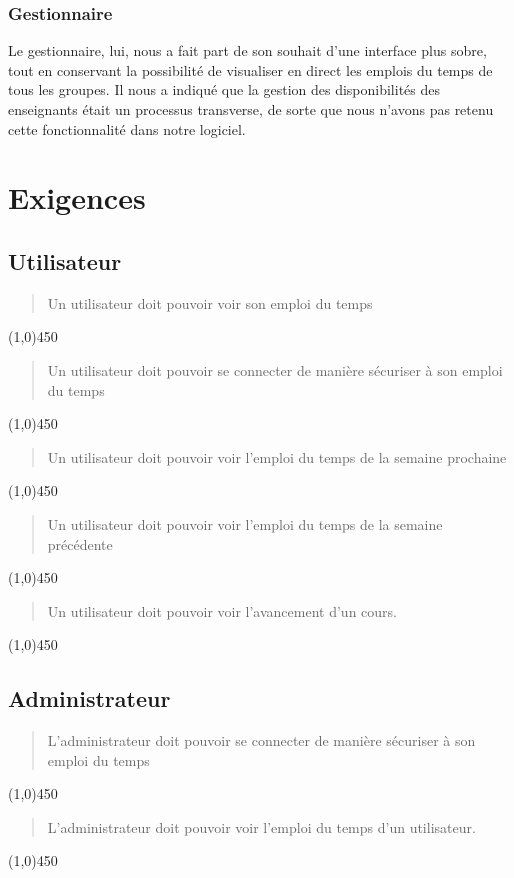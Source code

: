 \documentclass[a4paper,french,final]{memoir}
\begin{document}
\subsection{Gestionnaire}
Le gestionnaire, lui, nous a fait part de son souhait d'une interface plus sobre, tout en conservant la possibilité de visualiser en direct les emplois du temps de tous les groupes. Il nous a indiqué que la gestion des disponibilités des enseignants était un processus transverse, de sorte que nous n'avons pas retenu cette fonctionnalité dans notre logiciel. 
\mainmatter
\chapter{Exigences}\label{chap:exigence}
\section{Utilisateur
}
\begin{quote}
    Un utilisateur doit pouvoir voir son emploi du temps
\end{quote}
\line(1,0){450}

\begin{quote}
    Un utilisateur doit pouvoir se connecter de manière sécuriser à son emploi du temps
\end{quote}
\line(1,0){450}

\begin{quote}
    Un utilisateur doit pouvoir voir l'emploi du temps de la semaine prochaine
\end{quote}
\line(1,0){450}

\begin{quote}
    Un utilisateur doit pouvoir voir l'emploi du temps de la semaine précédente
\end{quote}
\line(1,0){450}

\begin{quote}
    Un utilisateur doit pouvoir voir l'avancement d'un cours.
\end{quote}
\line(1,0){450}


\section{Administrateur}
\begin{quote}
    L'administrateur doit pouvoir se connecter de manière sécuriser à son emploi du temps
\end{quote}
\line(1,0){450}

\begin{quote}
    L'administrateur doit pouvoir voir l'emploi du temps d'un utilisateur.
\end{quote}
\line(1,0){450}
\end{document}
